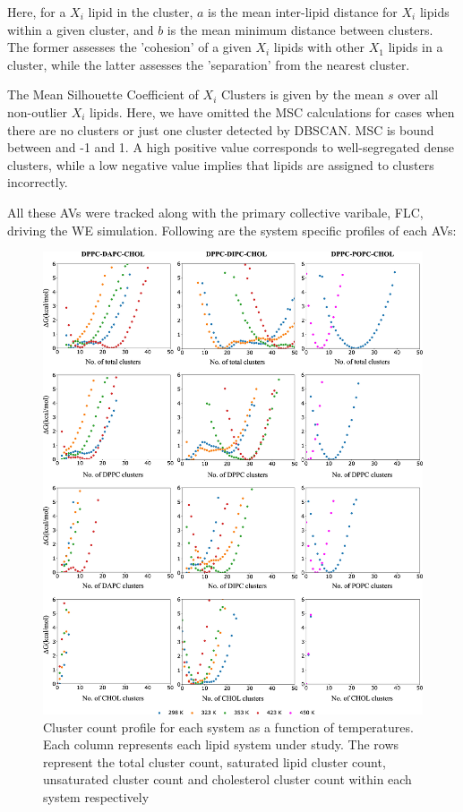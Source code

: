 \documentclass[10pt]{article}
\begin{document}
\noindent
Here, for a $X_i$ lipid in the cluster, $a$ is the mean inter-lipid distance for $X_i$ lipids within a given cluster, and $b$ is the mean minimum distance between clusters. The former assesses the 'cohesion' of a given $X_i$ lipids with other $X_1$ lipids in a cluster, while the latter assesses the 'separation' from the nearest cluster.

The Mean Silhouette Coefficient of $X_i$ Clusters is given by the mean $s$ over all non-outlier $X_i$ lipids.
Here, we have omitted the MSC calculations for cases when there are no clusters or just one cluster detected by DBSCAN. 
MSC is bound between and -1 and 1.
A high positive value corresponds to well-segregated dense clusters, while a low negative value implies that lipids are assigned to clusters incorrectly.  

All these AVs were tracked along with the primary collective varibale, FLC, driving the WE simulation.
Following are the system specific profiles of each AVs: 

\begin{figure}[H]
    \centering
    \includegraphics[width=6.5in]{Figures/Supplementary/AVs/ClusterCount/placeholder.jpg}
    \caption{Cluster count profile for each system as a function of temperatures. Each column represents each lipid system under study. The rows represent the total cluster count, saturated lipid cluster count, unsaturated cluster count and cholesterol cluster count within each system respectively}
    \label{figs2:view}
\end{figure}
\end{document}
